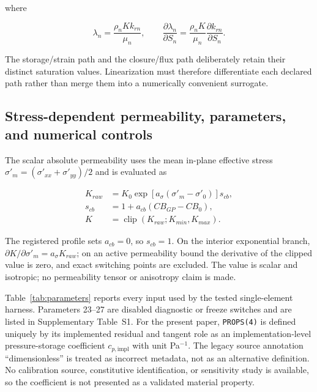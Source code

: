 \documentclass[preprint,12pt,authoryear]{elsarticle}
\begin{document}
where

\begin{equation}
\lambda_n=\frac{\rho_nKk_{rn}}{\mu_n},
\qquad
\frac{\partial\lambda_n}{\partial S_n}
=\frac{\rho_nK}{\mu_n}\frac{\partial k_{rn}}{\partial S_n}.
\end{equation}

The storage/strain path and the closure/flux path deliberately retain their distinct saturation values. Linearization must therefore differentiate each declared path rather than merge them into a numerically convenient surrogate.

\subsection{Stress-dependent permeability, parameters, and numerical controls}

The scalar absolute permeability uses the mean in-plane effective stress
$\sigma'_m=(\sigma'_{xx}+\sigma'_{yy})/2$ and is evaluated as

\begin{align}
K_{raw} &= K_0\exp\!\left[a_\sigma(\sigma'_m-\sigma'_0)\right]s_{cb},\\
s_{cb} &= 1+a_{cb}(CB_{GP}-CB_0),\\
K &= \operatorname{clip}(K_{raw};K_{min},K_{max}).
\end{align}

The registered profile sets $a_{cb}=0$, so $s_{cb}=1$. On the interior exponential branch,
$\partial K/\partial\sigma'_m=a_\sigma K_{raw}$; on an active permeability bound the derivative of the clipped value is zero, and exact switching points are excluded. The value is scalar and isotropic; no permeability tensor or anisotropy claim is made.

Table~\ref{tab:parameters} reports every input used by the tested single-element harness. Parameters 23--27 are disabled diagnostic or freeze switches and are listed in Supplementary Table~S1. For the present paper, \texttt{PROPS(4)} is defined uniquely by its implemented residual and tangent role as an implementation-level pressure-storage coefficient $c_{p,\mathrm{impl}}$ with unit Pa$^{-1}$. The legacy source annotation ``dimensionless'' is treated as incorrect metadata, not as an alternative definition. No calibration source, constitutive identification, or sensitivity study is available, so the coefficient is not presented as a validated material property.
\end{document}
